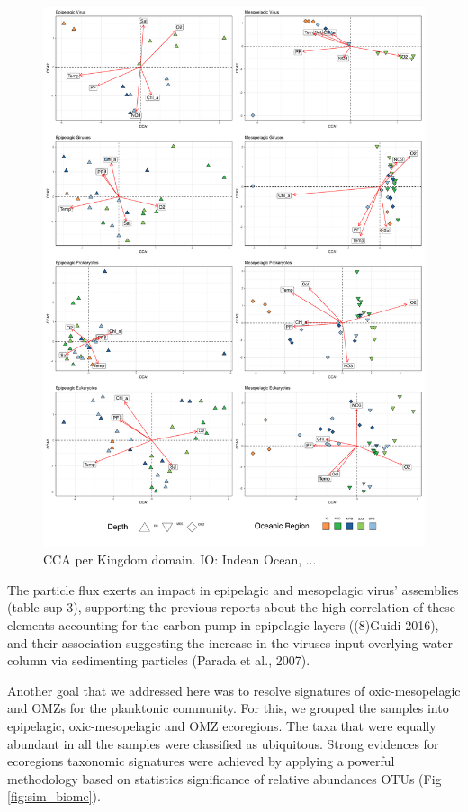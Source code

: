 \documentclass[fleqn,10pt]{wlscirep}
\begin{document}
\begin{figure}[ht]
    \centering
    \includegraphics[scale=0.35]{images/custom_cca_plot_hellinger_no_bathy_labels_OS_regions_colors_to_print.pdf}
    \caption{CCA per Kingdom domain. IO: Indean Ocean, ...}
    \label{fig:cca_OS}
\end{figure}

The particle flux exerts an impact in epipelagic and mesopelagic virus’ assemblies (table sup 3), supporting the previous reports about the high correlation of these elements accounting for the carbon pump in epipelagic layers ((8)Guidi 2016), and their association suggesting the increase in the viruses input overlying water column via sedimenting particles (Parada et al., 2007).

Another goal that we addressed here was to resolve signatures of oxic-mesopelagic and OMZs for the planktonic community. For this, we grouped the samples into epipelagic, oxic-mesopelagic and OMZ ecoregions. The taxa that were equally abundant in all the samples were classified as ubiquitous. Strong evidences for ecoregions taxonomic signatures were achieved by applying a powerful methodology based on statistics significance of relative abundances OTUs (Fig \ref{fig:sim_biome}).
\end{document}
